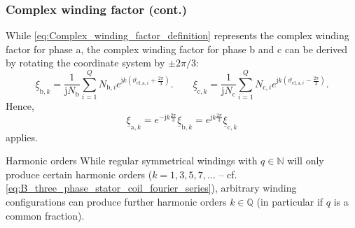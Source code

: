 \begin{frame}
	\frametitle{Complex winding factor (cont.)}
    While \eqref{eq:Complex_winding_factor_definition} represents the complex winding factor for phase a, the complex winding factor for phase b and c can be derived by rotating the coordinate system by $\pm 2\pi/3$:
    \begin{equation}
        \underline{\xi}_{\mathrm{b},k} = \frac{1}{\mathrm{j}N_\mathrm{b}}\sum_{i=1}^{Q} N_{\mathrm{b},i}e^{\mathrm{j}k\left(\vartheta_{\mathrm{el},\mathrm{a},i}+\frac{2\pi}{3}\right)}. \qquad  \underline{\xi}_{\mathrm{c},k} = \frac{1}{\mathrm{j}N_\mathrm{c}}\sum_{i=1}^{Q} N_{\mathrm{c},i}e^{\mathrm{j}k\left(\vartheta_{\mathrm{el},\mathrm{a},i}-\frac{2\pi}{3}\right)}.
        \label{eq:Complex_winding_factor_definition_phase_bc}    
    \end{equation}
    Hence,
    \begin{equation}
        \underline{\xi}_{\mathrm{a},k} = e^{-\mathrm{j}k\frac{2\pi}{3}}\underline{\xi}_{\mathrm{b},k} = e^{\mathrm{j}k\frac{2\pi}{3}}\underline{\xi}_{\mathrm{c},k}
        \label{eq:Complex_winding_factor_relation}
    \end{equation}
    applies. 
    \begin{varblock}{Harmonic orders}
        While regular symmetrical windings with $q\in\mathbb{N}$ will only produce certain harmonic orders ($k=1,3,5,7,\ldots$ -- cf. \eqref{eq:B_three_phase_stator_coil_fourier_series}), arbitrary winding configurations can produce further harmonic orders $k\in\mathbb{Q}$ (in particular if $q$ is a common fraction).
    \end{varblock}
\end{frame}

